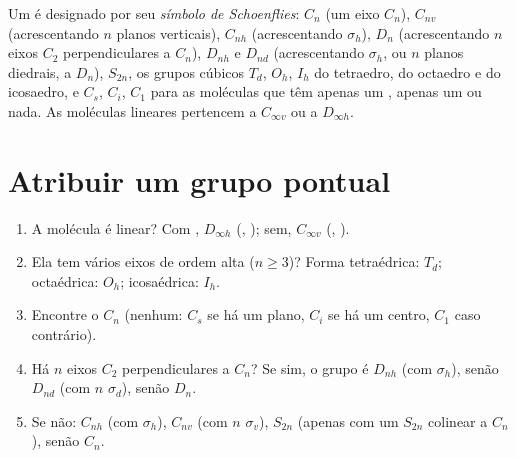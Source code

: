 \begin{definition}\label{def:b3:point-groups:schoenflies}
Um  é designado por seu \emph{símbolo de Schoenflies}:
$C_n$ (um eixo $C_n$), $C_{nv}$ (acrescentando $n$ planos verticais), $C_{nh}$
(acrescentando $\sigma_h$), $D_n$ (acrescentando $n$ eixos $C_2$ perpendiculares a $C_n$), $D_{nh}$
e $D_{nd}$ (acrescentando $\sigma_h$, ou $n$ planos diedrais, a $D_n$), $S_{2n}$, os
grupos cúbicos $T_d$, $O_h$, $I_h$ do tetraedro, do octaedro e do
icosaedro, e $C_s$, $C_i$, $C_1$ para as moléculas que têm apenas um ,
apenas um  ou nada. As moléculas lineares pertencem a
$C_{\infty v}$ ou a $D_{\infty h}$.
\end{definition}

\section{Atribuir um grupo pontual}

\begin{method}\label{met:b3:point-groups:assign}
\begin{enumerate}
  \item A molécula é linear? Com , $D_{\infty h}$
        (, ); sem, $C_{\infty v}$ (, ).
  \item Ela tem vários eixos de ordem alta ($n \ge 3$)? Forma tetraédrica:
        $T_d$; octaédrica: $O_h$; icosaédrica: $I_h$.
  \item Encontre o  $C_n$ (nenhum: $C_s$ se há um plano, $C_i$ se há um
        centro, $C_1$ caso contrário).
  \item Há $n$ eixos $C_2$ perpendiculares a $C_n$? Se sim, o grupo é
        $D_{nh}$ (com $\sigma_h$), senão $D_{nd}$ (com $n$ $\sigma_d$), senão
        $D_n$.
  \item Se não: $C_{nh}$ (com $\sigma_h$), $C_{nv}$ (com $n$ $\sigma_v$), $S_{2n}$
        (apenas com um $S_{2n}$ colinear a $C_n$), senão $C_n$.
\end{enumerate}
\end{method}

